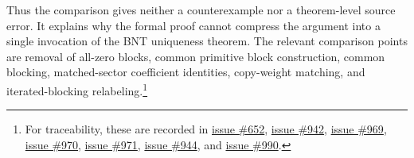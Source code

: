 \documentclass{article}
\begin{document}
Thus the comparison gives neither a counterexample nor a theorem-level source
error. It explains why the formal proof cannot compress the argument into a
single invocation of the BNT uniqueness theorem. The relevant comparison points are
removal of all-zero blocks, common primitive block construction, common blocking,
matched-sector coefficient identities, copy-weight matching, and iterated-blocking
relabeling.\footnote{For traceability, these are recorded in
\href{https://github.com/LionSR/TNLean/issues/652}{issue \#652},
\href{https://github.com/LionSR/TNLean/issues/942}{issue \#942},
\href{https://github.com/LionSR/TNLean/issues/969}{issue \#969},
\href{https://github.com/LionSR/TNLean/issues/970}{issue \#970},
\href{https://github.com/LionSR/TNLean/issues/971}{issue \#971},
\href{https://github.com/LionSR/TNLean/issues/944}{issue \#944}, and
\href{https://github.com/LionSR/TNLean/issues/990}{issue \#990}.}



\end{document}
